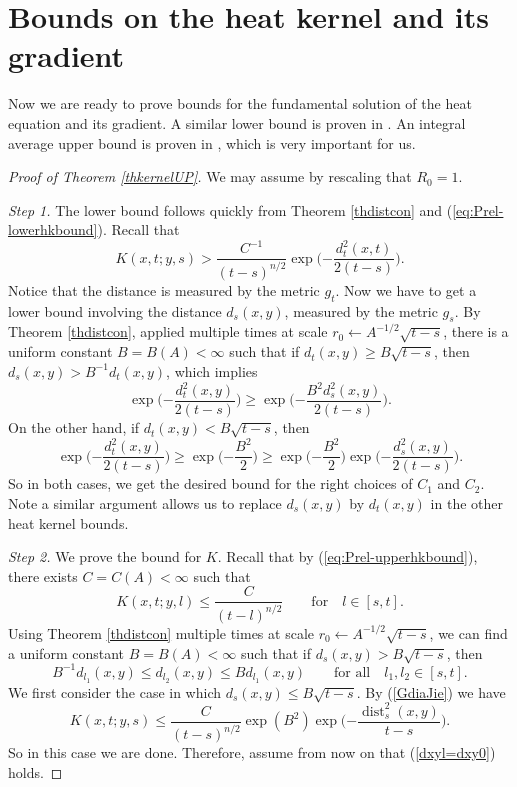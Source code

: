 \documentclass[11pt]{amsart}
\numberwithin{equation}{section}
\def\be{\begin{equation}}
\def\ee{\end{equation}}
\def\lab{\label}
\DeclareMathOperator{\dist}{dist}
\numberwithin{equation}{section}
\begin{document}
\section{Bounds on the heat kernel and its gradient} \label{sec:heatkernelbound}
Now we are ready to prove bounds for the fundamental solution of the heat equation and its gradient. 
A similar lower bound is proven in \cite{Z11:1}. 
An integral average upper bound is proven in \cite{HN:1}, which is very important for us.

\begin{proof}[Proof of Theorem \ref{thkernelUP}]
We may assume by rescaling that $R_0 = 1$.

\textit{Step 1.}
The lower bound follows quickly from Theorem \ref{thdistcon} and (\ref{eq:Prel-lowerhkbound}).
Recall that
\[ K(x,t; y,s) > \frac{C^{-1}}{(t-s)^{n/2}} \exp \Big( { - \frac{d^2_t(x,t)}{2(t-s)}} \Big). \]
Notice that the distance is measured by the metric $g_t$. 
Now we have to get a lower bound involving the distance $d_s (x, y)$, measured by the metric $g_s$. 
By Theorem \ref{thdistcon}, applied multiple times at scale $r_0 \leftarrow A^{-1/2} \sqrt{t-s}$, there is a uniform constant $B = B(A) < \infty$ such that if $d_t (x,y) \geq B \sqrt{t-s}$, then $d_s (x,y) > B^{-1} d_t (x,y)$, which implies
\[
\exp \Big( {- \frac{d^2_t(x, y)}{2(t-s)}  } \Big) \ge \exp \Big( {- \frac{B^{2} d^2_s (x, y)}{2(t-s)} } \Big).
\]
On the other hand, if $d_t (x,y) < B \sqrt{t-s}$, then
\[
\exp \Big( {- \frac{ d^2_t (x, y)}{2 (t-s)} } \Big) \ge \exp \Big({ - \frac{B^2}{2} }\Big)  \ge \exp \Big({ - \frac{B^2}{2} }\Big)  \exp \Big( {- \frac{d^2_s (x, y)}{2(t-s)} }\Big).
\]
So in both cases, we get the desired bound for the right choices of $C_1$ and $C_2$.
Note a similar argument allows us to replace $d_s (x, y)$ by $d_t (x, y)$ in the other heat kernel bounds.

\textit{Step 2.} 
We prove the  bound for $K$.
Recall that by (\ref{eq:Prel-upperhkbound}), there exists $C = C(A) < \infty$ such that
\be
\lab{GdiaJie}
 K(x, t; y, l) \le \frac{C}{(t-l)^{n/2}} \qquad  \text{for} \quad l \in [s, t].
\ee 
Using Theorem \ref{thdistcon} multiple times at scale $r_0 \leftarrow  A^{-1/2} \sqrt{t-s}$, we can find a uniform constant $B = B(A) < \infty$ such that if $d_s (x,y) > B \sqrt{t-s}$, then
\begin{equation} \label{dxyl=dxy0}
B^{-1} d_{l_1} (x,y) \leq d_{l_2} (x,y) \leq B d_{l_1} (x,y) \qquad \text{for all} \quad l_1, l_2 \in [s,t].
\end{equation}
We first consider the case in which $d_s (x,y) \leq  B \sqrt{t-s}$.
By (\ref{GdiaJie}) we have
\[ K(x,t; y, s) \leq \frac{C}{(t-s)^{n/2}}  \exp (B^2 ) \exp \Big( {- \frac{\dist_s^2 (x,y)}{t-s} } \Big). \]
So in this case we are done.
Therefore, assume from now on that (\ref{dxyl=dxy0}) holds.


\end{proof}
\end{document}

